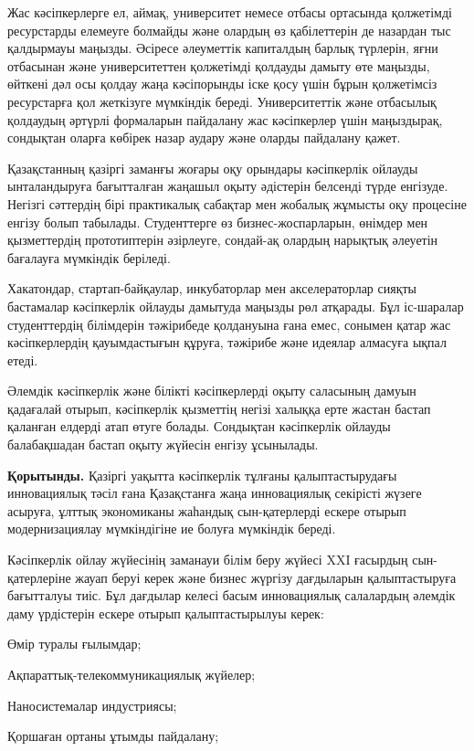 Жас кәсіпкерлерге ел, аймақ, университет немесе отбасы ортасында
қолжетімді ресурстарды елемеуге болмайды және олардың өз қабілеттерін де
назардан тыс қалдырмауы маңызды. Әсіресе әлеуметтік капиталдың барлық
түрлерін, яғни отбасынан және университеттен қолжетімді қолдауды дамыту
өте маңызды, өйткені дәл осы қолдау жаңа кәсіпорынды іске қосу үшін
бұрын қолжетімсіз ресурстарға қол жеткізуге мүмкіндік береді.
Университеттік және отбасылық қолдаудың әртүрлі формаларын пайдалану жас
кәсіпкерлер үшін маңыздырақ, сондықтан оларға көбірек назар аудару және
оларды пайдалану қажет.

Қазақстанның қазіргі заманғы жоғары оқу орындары кәсіпкерлік ойлауды
ынталандыруға бағытталған жаңашыл оқыту әдістерін белсенді түрде
енгізуде. Негізгі сәттердің бірі практикалық сабақтар мен жобалық
жұмысты оқу процесіне енгізу болып табылады. Студенттерге өз
бизнес-жоспарларын, өнімдер мен қызметтердің прототиптерін әзірлеуге,
сондай-ақ олардың нарықтық әлеуетін бағалауға мүмкіндік беріледі.

Хакатондар, стартап-байқаулар, инкубаторлар мен акселераторлар сияқты
бастамалар кәсіпкерлік ойлауды дамытуда маңызды рөл атқарады. Бұл
іс-шаралар студенттердің білімдерін тәжірибеде қолдануына ғана емес,
сонымен қатар жас кәсіпкерлердің қауымдастығын құруға, тәжірибе және
идеялар алмасуға ықпал етеді.

Әлемдік кәсіпкерлік және білікті кәсіпкерлерді оқыту саласының дамуын
қадағалай отырып, кәсіпкерлік қызметтің негізі халыққа ерте жастан
бастап қаланған елдерді атап өтуге болады. Сондықтан кәсіпкерлік ойлауды
балабақшадан бастап оқыту жүйесін енгізу ұсынылады.

{\bfseries Қорытынды.} Қазіргі уақытта кәсіпкерлік тұлғаны қалыптастырудағы
инновациялық тәсіл ғана Қазақстанға жаңа инновациялық секірісті жүзеге
асыруға, ұлттық экономиканы жаһандық сын-қатерлерді ескере отырып
модернизациялау мүмкіндігіне ие болуға мүмкіндік береді.

Кәсіпкерлік ойлау жүйесінің заманауи білім беру жүйесі XXI ғасырдың
сын-қатерлеріне жауап беруі керек және бизнес жүргізу дағдыларын
қалыптастыруға бағытталуы тиіс. Бұл дағдылар келесі басым инновациялық
салалардың әлемдік даму үрдістерін ескере отырып қалыптастырылуы керек:

Өмір туралы ғылымдар;

Ақпараттық-телекоммуникациялық жүйелер;

Наносистемалар индустриясы;

Қоршаған ортаны ұтымды пайдалану;

